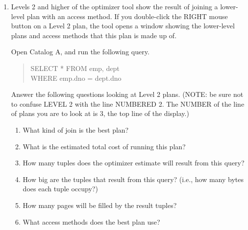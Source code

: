 \begin{enumerate}
\item

Levels 2 and higher of the optimizer tool show the result of joining a
lower-level plan with an access method.  If you double-click the RIGHT mouse
button on a Level 2 plan, the tool opens a window showing the lower-level
plans and access methods that this plan is made up of.

Open Catalog A, and run the following query.
\begin{quote}
        SELECT * FROM emp, dept\\
        WHERE emp.dno = dept.dno
\end{quote}

Answer the following
questions looking at Level 2 plans.  (NOTE: be sure not to confuse LEVEL 2
with the line NUMBERED 2.  The NUMBER of the line of plans you are to look
at is 3, the top line of the display.)
\begin{enumerate}
\item
What kind of join is the best plan?
\item
What is the estimated total cost of running this plan?
\item
How many tuples does the optimizer estimate will result from this query?
\item
How big are the tuples that result from this query?  (i.e., how many
bytes does each tuple occupy?)
\item
How many pages will be filled by the result tuples?
\item
What access methods does the best plan use?
\end{enumerate}


\end{enumerate}
